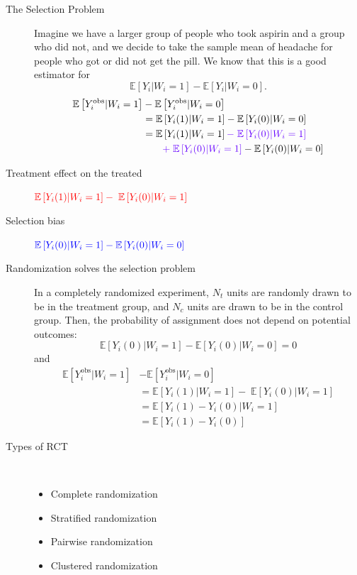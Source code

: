 \documentclass[a4paper,10pt,landscape]{article}
\begin{document}
\begin{multicols*}{3}
\begin{description}
	\item[The Selection Problem] Imagine we have a larger group of people who took aspirin and a group who did not, and we decide to take the sample mean of headache for people who got or did not get the pill. We know that this is a good estimator for $$\mathbb{E}\left[Y_i|W_i=1\right]-\mathbb{E}\left[Y_i|W_i=0\right].$$
	\begin{align*}
		\mathbb{E}\left[Y_i^\text{obs}|W_i=1\right] & -\mathbb{E}\left[Y_i^\text{obs}|W_i=0\right]\\
		& =\mathbb{E}\left[Y_i(1)|W_i=1\right]-\mathbb{E}\left[Y_i(0)|W_i=0\right]\\
		& =\mathbb{E}\left[Y_i(1)|W_i=1\right]\color{-green!40!yellow!}{-\;\mathbb{E}\left[Y_i(0)|W_i=1\right]}\\
		&\qquad {\color{-green!40!yellow!}+\;\mathbb{E}\left[Y_i(0)|W_i=1\right]}-\mathbb{E}\left[Y_i(0)|W_i=0\right]		
	\end{align*}
	\item[Treatment effect on the treated] ${\color{red}\mathbb{E}\left[Y_i(1)|W_i=1\right]-\;\mathbb{E}\left[Y_i(0)|W_i=1\right]}$
	\item[Selection bias] ${\color{blue}\mathbb{E}\left[Y_i(0)|W_i=1\right]-\mathbb{E}\left[Y_i(0)|W_i=0\right]}$
	\item[Randomization solves the selection problem] In a completely randomized experiment, $N_t$ units are randomly drawn to be in the treatment group, and $N_c$ units are drawn to be in the control group. Then, the probability of assignment does not depend on potential outcomes: $$\mathbb{E}\left[Y_i(0)|W_i=1\right]-\mathbb{E}\left[Y_i(0)|W_i=0\right]=0$$
	and 
	\begin{align*}
		\mathbb{E}\left[Y_i^\text{obs}|W_i=1\right] & -\mathbb{E}\left[Y_i^\text{obs}|W_i=0\right] \\
		& = \mathbb{E}\left[Y_i(1)|W_i=1\right]-\;\mathbb{E}\left[Y_i(0)|W_i=1\right]\\
		& = \mathbb{E}\left[Y_i(1)-Y_i(0)|W_i=1\right]\\
		& = \mathbb{E}\left[Y_i(1)-Y_i(0)\right]
	\end{align*}
	\item[Types of RCT] ~
	\begin{itemize}[itemsep=0pt]
		\item Complete randomization
		\item Stratified randomization
		\item Pairwise randomization
		\item Clustered randomization
	\end{itemize}
\end{description}


\end{multicols*}
\end{document}
